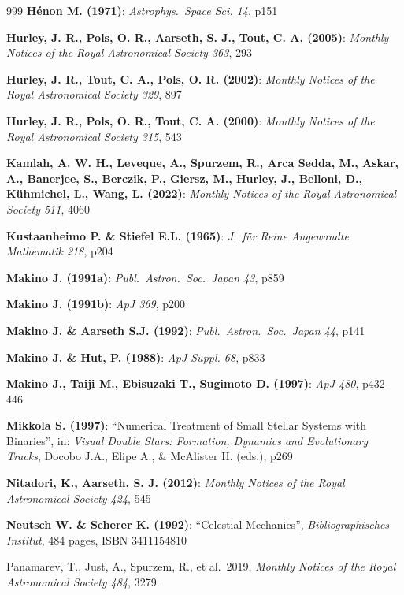 \begin{thebibliography}{999}
\textbf{H\'enon M. (1971)}:
    \textit{Astrophys.\ Space Sci. 14}, p151

\textbf{Hurley, J. R., Pols, O. R., Aarseth, S. J., Tout, C. A. (2005)}:     \textit{Monthly Notices of the Royal Astronomical Society 363}, 293

\textbf{Hurley, J. R., Tout, C. A., Pols, O. R. (2002)}:     \textit{Monthly Notices of the Royal Astronomical Society 329}, 897

\textbf{Hurley, J. R., Pols, O. R., Tout, C. A. (2000)}:     \textit{Monthly Notices of the Royal Astronomical Society 315}, 543

\textbf{Kamlah, A. W. H., Leveque, A., Spurzem, R., Arca Sedda, M., Askar, A., Banerjee, S., Berczik, P., Giersz, M., Hurley, J., Belloni, D., Kühmichel, L., Wang, L. (2022)}:     \textit{Monthly Notices of the Royal Astronomical Society 511}, 4060

\textbf{Kustaanheimo P. \& Stiefel E.L. (1965)}:
    \textit{J.\ f\"ur Reine Angewandte Mathematik 218}, p204


\textbf{Makino J. (1991a)}:
    \textit{Publ.\ Astron.\ Soc.\ Japan 43}, p859

\textbf{Makino J. (1991b)}:
    \textit{ApJ 369}, p200

\textbf{Makino J. \& Aarseth S.J. (1992)}:
    \textit{Publ.\ Astron.\ Soc.\ Japan 44}, p141

\textbf{Makino J. \& Hut, P. (1988)}:
    \textit{ApJ Suppl. 68}, p833

\textbf{Makino J., Taiji M., Ebisuzaki T., Sugimoto D. (1997)}:
    \textit{ApJ 480}, p432--446


\textbf{Mikkola S. (1997)}:
    ``Numerical Treatment of Small Stellar Systems with
    Binaries'',
    in: \textit{Visual Double Stars: Formation, Dynamics and
    Evolutionary Tracks}, Docobo J.A., Elipe A., \&
    McAlister H. (eds.), p269

\textbf{Nitadori, K., Aarseth, S. J. (2012)}:     \textit{Monthly Notices of the Royal Astronomical Society 424}, 545

\textbf{Neutsch W. \& Scherer K. (1992)}:
    ``Celestial Mechanics'',
     \textit{Bibliographisches Institut}, 484 pages,
     ISBN 3411154810

 Panamarev, T., Just, A., Spurzem, R., et al.\ 2019, \textit{Monthly Notices of the Royal Astronomical Society 484}, 3279.


\end{thebibliography}
